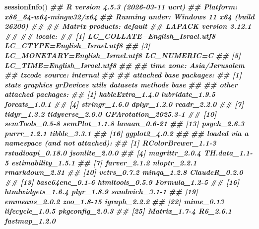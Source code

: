 \documentclass[
]{article}
\newenvironment{Shaded}{\begin{snugshade}}{\end{snugshade}}
\newcommand{\DocumentationTok}[1]{\textcolor[rgb]{0.56,0.35,0.01}{\textbf{\textit{#1}}}}
\newcommand{\FunctionTok}[1]{\textcolor[rgb]{0.13,0.29,0.53}{\textbf{#1}}}
\newcommand{\NormalTok}[1]{#1}
\begin{document}
\begin{Shaded}
\begin{Highlighting}[]
\FunctionTok{sessionInfo}\NormalTok{()}
\DocumentationTok{\#\# R version 4.5.3 (2026{-}03{-}11 ucrt)}
\DocumentationTok{\#\# Platform: x86\_64{-}w64{-}mingw32/x64}
\DocumentationTok{\#\# Running under: Windows 11 x64 (build 26200)}
\DocumentationTok{\#\# }
\DocumentationTok{\#\# Matrix products: default}
\DocumentationTok{\#\#   LAPACK version 3.12.1}
\DocumentationTok{\#\# }
\DocumentationTok{\#\# locale:}
\DocumentationTok{\#\# [1] LC\_COLLATE=English\_Israel.utf8  LC\_CTYPE=English\_Israel.utf8   }
\DocumentationTok{\#\# [3] LC\_MONETARY=English\_Israel.utf8 LC\_NUMERIC=C                   }
\DocumentationTok{\#\# [5] LC\_TIME=English\_Israel.utf8    }
\DocumentationTok{\#\# }
\DocumentationTok{\#\# time zone: Asia/Jerusalem}
\DocumentationTok{\#\# tzcode source: internal}
\DocumentationTok{\#\# }
\DocumentationTok{\#\# attached base packages:}
\DocumentationTok{\#\# [1] stats     graphics  grDevices utils     datasets  methods   base     }
\DocumentationTok{\#\# }
\DocumentationTok{\#\# other attached packages:}
\DocumentationTok{\#\#  [1] kableExtra\_1.4.0     lubridate\_1.9.5      forcats\_1.0.1       }
\DocumentationTok{\#\#  [4] stringr\_1.6.0        dplyr\_1.2.0          readr\_2.2.0         }
\DocumentationTok{\#\#  [7] tidyr\_1.3.2          tidyverse\_2.0.0      GPArotation\_2025.3{-}1}
\DocumentationTok{\#\# [10] semTools\_0.5{-}8       semPlot\_1.1.8        lavaan\_0.6{-}21       }
\DocumentationTok{\#\# [13] psych\_2.6.3          purrr\_1.2.1          tibble\_3.3.1        }
\DocumentationTok{\#\# [16] ggplot2\_4.0.2       }
\DocumentationTok{\#\# }
\DocumentationTok{\#\# loaded via a namespace (and not attached):}
\DocumentationTok{\#\#   [1] RColorBrewer\_1.1{-}3    rstudioapi\_0.18.0     jsonlite\_2.0.0       }
\DocumentationTok{\#\#   [4] magrittr\_2.0.4        TH.data\_1.1{-}5         estimability\_1.5.1   }
\DocumentationTok{\#\#   [7] farver\_2.1.2          nloptr\_2.2.1          rmarkdown\_2.31       }
\DocumentationTok{\#\#  [10] vctrs\_0.7.2           minqa\_1.2.8           ClaudeR\_0.2.0        }
\DocumentationTok{\#\#  [13] base64enc\_0.1{-}6       htmltools\_0.5.9       Formula\_1.2{-}5        }
\DocumentationTok{\#\#  [16] htmlwidgets\_1.6.4     plyr\_1.8.9            sandwich\_3.1{-}1       }
\DocumentationTok{\#\#  [19] emmeans\_2.0.2         zoo\_1.8{-}15            igraph\_2.2.2         }
\DocumentationTok{\#\#  [22] mime\_0.13             lifecycle\_1.0.5       pkgconfig\_2.0.3      }
\DocumentationTok{\#\#  [25] Matrix\_1.7{-}4          R6\_2.6.1              fastmap\_1.2.0        }

\end{Highlighting}
\end{Shaded}
\end{document}
